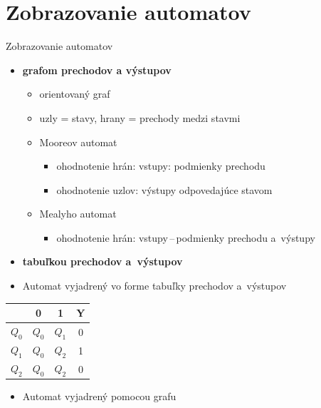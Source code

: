 \documentclass[hyperref={unicode}]{beamer}
\begin{document}
\section{Zobrazovanie automatov}
\begin{frame}{Zobrazovanie automatov}
\transwipe
\begin{itemize}
\pause
\item \textbf{grafom prechodov a výstupov}
\begin{itemize}
\pause
\item [\textendash] orientovaný graf
\item [\textendash] uzly = stavy, hrany = prechody medzi stavmi
\item [\textendash] Mooreov automat
\begin{itemize}
\item ohodnotenie hrán: vstupy: podmienky prechodu
\item ohodnotenie uzlov: výstupy odpovedajúce stavom
\end{itemize}
\item [\textendash] Mealyho automat
\begin{itemize}
\item ohodnotenie hrán: vstupy\,--\,podmienky prechodu a~výstupy
\end{itemize}
\end{itemize}
\pause
\item \textbf{tabuľkou prechodov a~výstupov}
\end{itemize}
\end{frame}

\begin{frame}
\transwipe
\begin{itemize}
\item Automat vyjadrený vo forme tabuľky prechodov a~výstupov
\end{itemize}
\begin{table}[h]
\centering
\begin{tabular}{|c|c|c|c|}
\hline
   & 0  & 1  & Y \\ \hline
$Q_0$ & $Q_0$ & $Q_1$ & 0 \\ \hline
$Q_1$ & $Q_0$ & $Q_2$ & 1 \\ \hline
$Q_2$ & $Q_0$ & $Q_2$ & 0 \\ \hline
\end{tabular}
\end{table}
\begin{itemize}
\item Automat vyjadrený pomocou grafu
\begin{figure}[h]
\centering
{}
\end{figure}
\end{itemize}
\end{frame}
\end{document}
